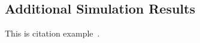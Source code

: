 \appendix
\begin{bibunit}
\chapter{Additional Simulation Results}\label{appendix:A}

% 

This is citation example~\cite{Einstein1905PE,Einstein1905SR}.
\lipsum[50]

\putbib
\end{bibunit}
